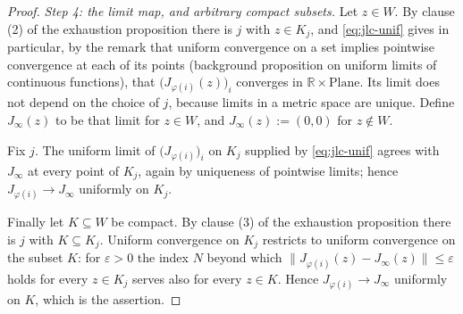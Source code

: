 \begin{proof}
\medskip\noindent\emph{Step 4: the limit map, and arbitrary compact subsets.}
Let $z\in W$.  By clause (2) of the exhaustion proposition there is $j$ with $z\in K_j$, and
\eqref{eq:jlc-unif} gives in particular, by the remark that uniform convergence on a set
implies pointwise convergence at each of its points (background proposition on uniform limits
of continuous functions), that $\bigl(J_{\varphi(i)}(z)\bigr)_i$ converges in
$\mathbb{R}\times\mathrm{Plane}$.  Its limit does not depend on the choice of $j$, because
limits in a metric space are unique.  Define $J_\infty(z)$ to be that limit for $z\in W$, and
$J_\infty(z):=(0,0)$ for $z\notin W$.

Fix $j$.  The uniform limit of $\bigl(J_{\varphi(i)}\bigr)_i$ on $K_j$ supplied by
\eqref{eq:jlc-unif} agrees with $J_\infty$ at every point of $K_j$, again by uniqueness of
pointwise limits; hence $J_{\varphi(i)}\to J_\infty$ uniformly on $K_j$.

Finally let $K\subseteq W$ be compact.  By clause (3) of the exhaustion proposition there is $j$
with $K\subseteq K_j$.  Uniform convergence on $K_j$ restricts to uniform convergence on the
subset $K$: for $\varepsilon>0$ the index $N$ beyond which
$\lVert J_{\varphi(i)}(z)-J_\infty(z)\rVert\le\varepsilon$ holds for every $z\in K_j$ serves
also for every $z\in K$.  Hence $J_{\varphi(i)}\to J_\infty$ uniformly on $K$, which is the
assertion.
\end{proof}
